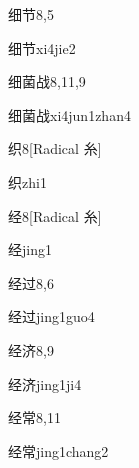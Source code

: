 \begin{entry}{细节}{8,5}
  \begin{phonetics}{细节}{xi4jie2}
  \end{phonetics}
\end{entry}

\begin{entry}{细菌战}{8,11,9}
  \begin{phonetics}{细菌战}{xi4jun1zhan4}
  \end{phonetics}
\end{entry}

\begin{entry}{织}{8}[Radical 糸]
  \begin{phonetics}{织}{zhi1}
  \end{phonetics}
\end{entry}

\begin{entry}{经}{8}[Radical 糸]
  \begin{phonetics}{经}{jing1}
  \end{phonetics}
\end{entry}

\begin{entry}{经过}{8,6}
  \begin{phonetics}{经过}{jing1guo4}
  \end{phonetics}
\end{entry}

\begin{entry}{经济}{8,9}
  \begin{phonetics}{经济}{jing1ji4}
  \end{phonetics}
\end{entry}

\begin{entry}{经常}{8,11}
  \begin{phonetics}{经常}{jing1chang2}
  \end{phonetics}
\end{entry}

